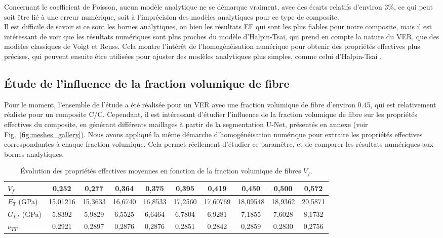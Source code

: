 \documentclass[a4paper,11pt]{article}
\begin{document}
Concernant le coefficient de Poisson, aucun modèle analytique ne se démarque vraiment, avec des écarts relatifs d'environ 3\%, ce qui peut soit être lié à une erreur numérique, soit à l'imprécision des modèles analytiques pour ce type de composite. \\

Il est difficile de savoir si ce sont les bornes analytiques, ou bien les résultats EF qui sont les plus fiables pour notre composite, mais il est intéressant de voir que les résultats numériques sont plus proches du modèle d'Halpin-Tsai, qui prend en compte la nature du VER, que des modèles classiques de Voigt et Reuss. Cela montre l'intérêt de l'homogénéisation numérique pour obtenir des propriétés effectives plus précises, qui peuvent ensuite être utilisées pour ajuster des modèles analytiques plus simples, comme celui d'Halpin-Tsai \cite{WallHomog}.


\subsection{Étude de l'influence de la fraction volumique de fibre}

Pour le moment, l'ensemble de l'étude a été réalisée pour un VER avec une fraction volumique de fibre d'environ 0.45, qui est relativement réaliste pour un composite C/C. Cependant, il est intéressant d'étudier l'influence de la fraction volumique de fibre sur les propriétés effectives du composite, en générant différents maillages à partir de la segmentation U-Net, présentés en annexe (voir Fig.~\ref{fig:meshes_gallery}). Nous avons appliqué la même démarche d'homogénéisation numérique pour extraire les propriétés effectives correspondantes à chaque fraction volumique. Cela permet réellement d'étudier ce paramètre, et de comparer les résultats numériques aux bornes analytiques. \\

\begin{table}[H]
    \centering
    \footnotesize
    \begin{tabular}{|l|c|c|c|c|c|c|c|c|c|}
        \hline
        \textbf{$V_f$} 
        & \textbf{0,252} & \textbf{0,277} & \textbf{0,364} & \textbf{0,375} 
        & \textbf{0,395} & \textbf{0,419} & \textbf{0,450} & \textbf{0,500} & \textbf{0,572} \\
        \hline
        $E_T$ (GPa) & 15,01216 & 15,3633 & 16,6740 & 16,8533 & 17,2560 & 17,60769 & 18,09548 & 18,9362 & 20,5871 \\
        \hline
        $G_{LT}$ (GPa) & 5,8392 & 5,9829 & 6,5525 & 6,6464 & 6,7804 & 6,9281 & 7,1855 & 7,6028 & 8,1732 \\
        \hline
        $\nu_{TT}$ & 0,2921 & 0,2897 & 0,2876 & 0,2876 & 0,2851 & 0,2842 & 0,2859 & 0,2830 & 0,2756 \\
        \hline
    \end{tabular}
    \caption{Évolution des propriétés effectives moyennes en fonction de la fraction volumique de fibres $V_f$.}
    \label{tab:etude_vf}
\end{table}
\end{document}
